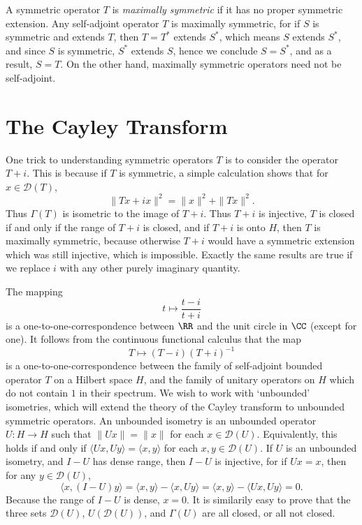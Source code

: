A symmetric operator $T$ is \emph{maximally symmetric} if it has no proper symmetric extension. Any self-adjoint operator $T$ is maximally symmetric, for if $S$ is symmetric and extends $T$, then $T = T^*$ extends $S^*$, which means $S$ extends $S^*$, and since $S$ is symmetric, $S^*$ extends $S$, hence we conclude $S = S^*$, and as a result, $S = T$. On the other hand, maximally symmetric operators need not be self-adjoint.

\section{The Cayley Transform}

One trick to understanding symmetric operators $T$ is to consider the operator $T + i$. This is because if $T$ is symmetric, a simple calculation shows that for $x \in \mathcal{D}(T)$,
%
\[ \| Tx + i x \|^2 = \| x \|^2 + \| Tx \|^2. \]
%
Thus $\Gamma(T)$ is isometric to the image of $T + i$. Thus $T + i$ is injective, $T$ is closed if and only if the range of $T + i$ is closed, and if $T + i$ is onto $H$, then $T$ is maximally symmetric, because otherwise $T + i$ would have a symmetric extension which was still injective, which is impossible. Exactly the same results are true if we replace $i$ with any other purely imaginary quantity.

The mapping
%
\[ t \mapsto \frac{t - i}{t + i} \]
%
is a one-to-one-correspondence between $\RR$ and the unit circle in $\CC$ (except for one). It follows from the continuous functional calculus that the map
%
\[ T \mapsto (T - i)(T + i)^{-1} \]
%
is a one-to-one-correspondence between the family of self-adjoint bounded operator $T$ on a Hilbert space $H$, and the family of unitary operators on $H$ which do not contain $1$ in their spectrum. We wish to work with `unbounded' isometries, which will extend the theory of the Cayley transform to unbounded symmetric operators. An unbounded isometry is an unbounded operator $U: H \to H$ such that $\| Ux \| = \| x \|$ for each $x \in \mathcal{D}(U)$. Equivalently, this holds if and only if $\langle Ux, Uy \rangle = \langle x, y \rangle$ for each $x,y \in \mathcal{D}(U)$. If $U$ is an unbounded isometry, and $I - U$ has dense range, then $I - U$ is injective, for if $Ux = x$, then for any $y \in \mathcal{D}(U)$,
%
\[ \langle x, (I - U)y \rangle = \langle x, y \rangle - \langle x, Uy \rangle = \langle x,y \rangle - \langle Ux, Uy \rangle = 0. \]
%
Because the range of $I - U$ is dense, $x = 0$. It is similarily easy to prove that the three sets $\mathcal{D}(U)$, $U(\mathcal{D}(U))$, and $\Gamma(U)$ are all closed, or all not closed.

